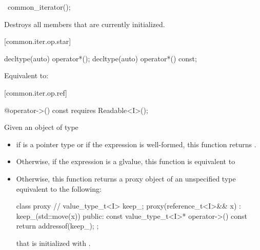 %
\begin{itemdecl}
~common_iterator();
\end{itemdecl}

\begin{itemdescr}
\pnum
\effects
Destroys all members that are currently initialized.
\end{itemdescr}

[common.iter.op.star]{}

%
%
\begin{itemdecl}
decltype(auto) operator*();
decltype(auto) operator*() const;
\end{itemdecl}

\begin{itemdescr}
\pnum
\requires {}

\pnum
\effects Equivalent to: 
\end{itemdescr}

[common.iter.op.ref]{}

%
%
\begin{itemdecl}
@\seebelow@ operator->() const requires Readable<I>();
\end{itemdecl}

\begin{itemdescr}
\pnum
\requires {}

\pnum
\effects Given an object  of type 
\begin{itemize}
\item if  is a pointer type or if the expression
       is well-formed, this function returns
      .
\item Otherwise, if the expression  is a glvalue, this function
      is equivalent to 
\item Otherwise, this function returns a proxy object of an unspecified type
      equivalent to the following:
      \begin{codeblock}
      class proxy {               // \expos
        value_type_t<I> keep_;
        proxy(reference_t<I>&& x)
          : keep_(std::move(x)) {}
      public:
        const value_type_t<I>* operator->() const {
          return addressof(keep_);
        }
      };
      \end{codeblock}
      that is initialized with .
\end{itemize}
\end{itemdescr}


